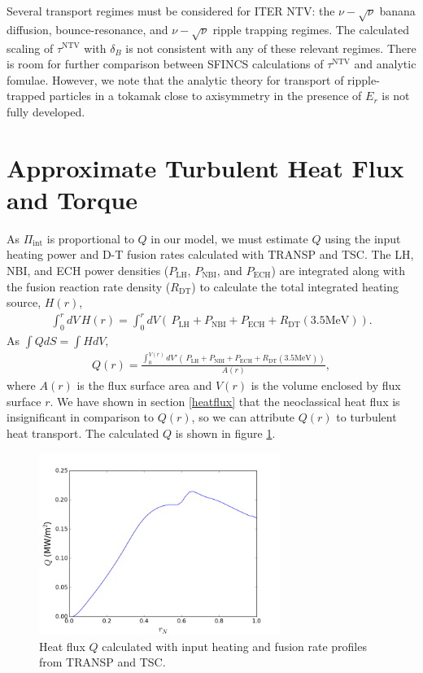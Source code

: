 \documentclass[aip, pop, preprint]{revtex4-1}
\numberwithin{figure}{section}
\numberwithin{equation}{section}
\begin{document}
Several transport regimes must be considered for ITER NTV: the $\nu-\sqrt{\nu}$ banana diffusion, bounce-resonance, and $\nu-\sqrt{\nu}$ ripple trapping regimes. The calculated scaling of $\tau^{\text{NTV}}$ with $\delta_B$ is not consistent with any of these relevant regimes. There is room for further comparison between SFINCS calculations of $\tau^{\text{NTV}}$ and analytic fomulae. However, we note that the analytic theory for transport of ripple-trapped particles in a tokamak close to axisymmetry in the presence of $E_r$ is not fully developed. 

\appendix

\section{Approximate Turbulent Heat Flux and Torque}\label{turbQ}

As $\Pi_{\text{int}}$ is proportional to $Q$ in our model, we must estimate $Q$ using the input heating power and D-T fusion rates calculated with TRANSP and TSC. The LH, NBI, and ECH power densities ($P_{\text{LH}}$, $P_{\text{NBI}}$, and $P_{\text{ECH}}$) are integrated along with the fusion reaction rate density ($R_{\text{DT}}$) to calculate the total integrated heating source, $H(r)$,
\begin{gather}
\int_0^r dV \, H(r) = \int_0^r dV \left(\, P_{\text{LH}} + P_{\text{NBI}} + P_{\text{ECH}} + R_{\text{DT}} (3.5 \text{MeV}) \right).
\end{gather}
As $\int Q dS = \int H dV$, 
\begin{gather}
Q(r) = \frac{\int_0^{V(r)} dV' \left(\, P_{\text{LH}} + P_{\text{NBI}} + P_{\text{ECH}} + R_{\text{DT}} (3.5 \text{MeV}) \right)}{A(r)},
\end{gather}
where $A(r)$ is the flux surface area and $V(r)$ is the volume enclosed by flux surface $r$. We have shown in section \ref{heatflux} that the neoclassical heat flux is insignificant in comparison to $Q(r)$, so we can attribute $Q(r)$ to turbulent heat transport. The calculated $Q$ is shown in figure \ref{fig:turbHeatFlux}.

\begin{figure}[h!]
\centering
\includegraphics[width=0.7\textwidth]{turbHeatFlux.png}
\caption{\label{fig:turbHeatFlux} Heat flux $Q$ calculated with input heating and fusion rate profiles from TRANSP and TSC.}
\end{figure}
\end{document}
